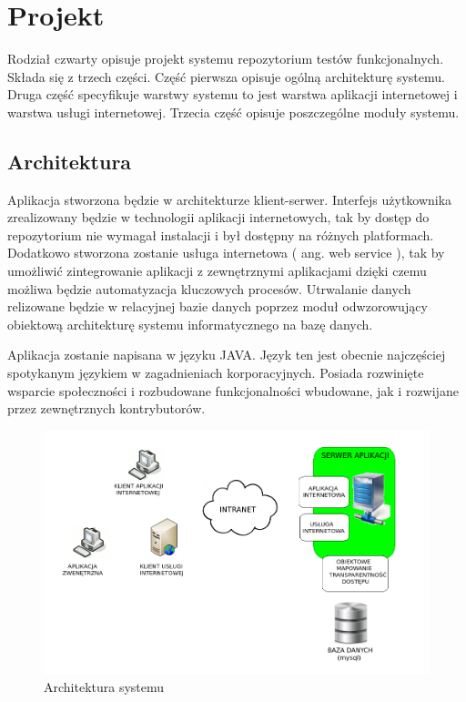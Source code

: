 \chapter{Projekt}
Rodział czwarty opisuje projekt systemu repozytorium testów funkcjonalnych. Składa się z trzech części. Część pierwsza opisuje ogólną architekturę systemu. Druga część specyfikuje warstwy systemu to jest warstwa aplikacji internetowej i warstwa usługi internetowej. Trzecia część opisuje poszczególne moduły systemu.

\section{Architektura}
Aplikacja stworzona będzie w architekturze klient-serwer. Interfejs użytkownika zrealizowany będzie w technologii aplikacji internetowych, tak by dostęp do repozytorium nie wymagał instalacji i był dostępny na różnych platformach. Dodatkowo stworzona zostanie usługa internetowa ( ang. web service ), tak by umożliwić zintegrowanie aplikacji z zewnętrznymi aplikacjami dzięki czemu możliwa będzie automatyzacja kluczowych procesów. Utrwalanie danych relizowane będzie w relacyjnej bazie danych poprzez moduł odwzorowujący obiektową architekturę systemu informatycznego na bazę danych.

Aplikacja zostanie napisana w języku JAVA. Język ten jest obecnie najczęściej spotykanym językiem w zagadnieniach korporacyjnych. Posiada rozwinięte wsparcie społeczności i rozbudowane funkcjonalności wbudowane, jak i rozwijane przez zewnętrznych kontrybutorów. 
\begin{figure}[h]
\centerline{\includegraphics[scale=0.45]{img/architektura.png}}
\caption{Architektura systemu}
\label{fig:architektura}
\end{figure}


